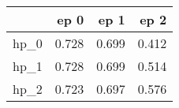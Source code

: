 \begin{tabular}{lrrr}
\toprule
{} &   ep 0 &   ep 1 &   ep 2 \\
\midrule
hp\_0 &  0.728 &  0.699 &  0.412 \\
hp\_1 &  0.728 &  0.699 &  0.514 \\
hp\_2 &  0.723 &  0.697 &  0.576 \\
\bottomrule
\end{tabular}
